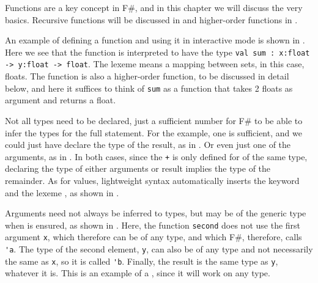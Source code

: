 \documentclass[fsharpnotes.tex]{subfiles}
\begin{document}
Functions are a key concept in F\#, and in this chapter we will discuss the very basics. Recursive functions will be discussed in  and higher-order functions in .

An example of defining a function and using it in interactive mode is shown in .
%
%
Here we see that the function is interpreted to have the type \lstinline!val sum : x:float -> y:float -> float!. The \lexeme{->} lexeme means a mapping between sets, in this case, floats. The function is also a higher-order function, to be discussed in detail below, and here it suffices to think of \lstinline!sum! as a function that takes 2 floats as argument and returns a float.

Not all types need to be declared, just a sufficient number for F\# to be able to infer the types for the full statement. For the example, one is sufficient, and we could just have declare the type of the result, as in .
%
%
Or even just one of the arguments, as in .
%
%
In both cases, since the \lstinline|+|  is only defined for  of the same type, declaring the type of either arguments or result implies the type of the remainder.  As for values, lightweight syntax automatically inserts the keyword  and the lexeme \lexeme{;}, as shown in .
%
%

Arguments need not always be inferred to types, but may be of the generic type when  is ensured, as shown in .
%
%
Here, the function \lstinline{second} does not use the first argument \lstinline{x}, which therefore can be of any type, and which F\#, therefore, calls \lstinline{'a}. The type of the second element, \lstinline{y}, can also be of any type and not necessarily the same as \lstinline!x!, so it is called \lstinline!'b!. Finally, the result is the same type as \lstinline!y!, whatever it is. This is an example of a , since it will work on any type.
\end{document}
